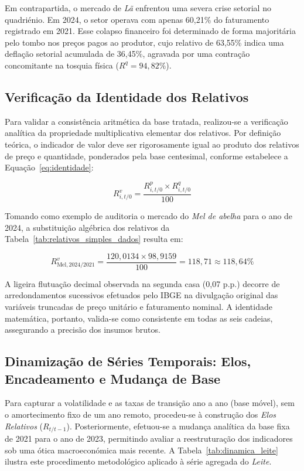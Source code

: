 \documentclass[12pt,a4paper]{article}
\begin{document}
Em contrapartida, o mercado de \textit{Lã} enfrentou uma severa crise setorial no quadriénio. Em 2024, o setor operava com apenas 60,21\% do faturamento registrado em 2021. Esse colapso financeiro foi determinado de forma majoritária pelo tombo nos preços pagos ao produtor, cujo relativo de 63,55\% indica uma deflação setorial acumulada de 36,45\%, agravada por uma contração concomitante na tosquia física ($R^q = 94,82\%$).

\subsection{Verificação da Identidade dos Relativos}

Para validar a consistência aritmética da base tratada, realizou-se a verificação analítica da propriedade multiplicativa elementar dos relativos. Por definição teórica, o indicador de valor deve ser rigorosamente igual ao produto dos relativos de preço e quantidade, ponderados pela base centesimal, conforme estabelece a Equação~\ref{eq:identidade}:

\begin{equation}
\label{eq:identidade}
R_{i,t/0}^{v} = \frac{R_{i,t/0}^{p} \times R_{i,t/0}^{q}}{100}
\end{equation}

Tomando como exemplo de auditoria o mercado do \textit{Mel de abelha} para o ano de 2024, a substituição algébrica dos relativos da Tabela~\ref{tab:relativos_simples_dados} resulta em:

\begin{equation}
R_{\text{Mel},2024/2021}^{v} = \frac{120,0134 \times 98,9159}{100} = 118,71 \approx 118,64\%
\end{equation}

A ligeira flutuação decimal observada na segunda casa (0,07 p.p.) decorre de arredondamentos sucessivos efetuados pelo IBGE na divulgação original das variáveis truncadas de preço unitário e faturamento nominal. A identidade matemática, portanto, valida-se como consistente em todas as seis cadeias, assegurando a precisão dos insumos brutos.

\subsection{Dinamização de Séries Temporais: Elos, Encadeamento e Mudança de Base}

Para capturar a volatilidade e as taxas de transição ano a ano (base móvel), sem o amortecimento fixo de um ano remoto, procedeu-se à construção dos \textit{Elos Relativos} ($R_{t/t-1}$). Posteriormente, efetuou-se a mudança analítica da base fixa de 2021 para o ano de 2023, permitindo avaliar a reestruturação dos indicadores sob uma ótica macroeconómica mais recente. A Tabela~\ref{tab:dinamica_leite} ilustra este procedimento metodológico aplicado à série agregada do \textit{Leite}.
\end{document}
